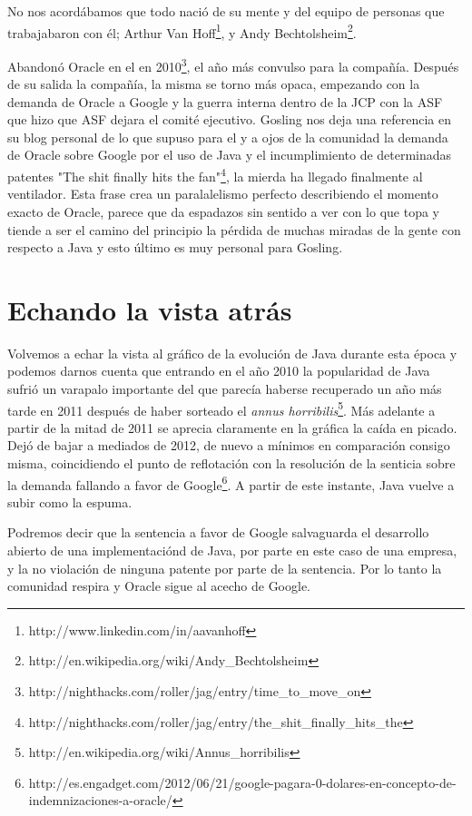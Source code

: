 \documentclass[11pt]{scrartcl}
\begin{document}
No nos acordábamos que todo nació de su mente y del equipo de personas que trabajabaron con él; Arthur Van Hoff\footnote{http://www.linkedin.com/in/aavanhoff}, y Andy Bechtolsheim\footnote{http://en.wikipedia.org/wiki/Andy\_Bechtolsheim}.

Abandonó Oracle en el en 2010\footnote{http://nighthacks.com/roller/jag/entry/time\_to\_move\_on}, el año más convulso para la compañía. Después de su salida la compañía, la misma se torno más opaca, empezando con la demanda de Oracle a Google y la guerra interna dentro de la JCP con la ASF que hizo que ASF dejara el comité ejecutivo. Gosling nos deja una referencia en su blog personal de lo que supuso para el y a ojos de la comunidad la demanda de Oracle sobre Google por el uso de Java y el incumplimiento de determinadas patentes "The shit finally hits the fan"\footnote{http://nighthacks.com/roller/jag/entry/the\_shit\_finally\_hits\_the}, la mierda ha llegado finalmente al ventilador. Esta frase crea un paralalelismo perfecto describiendo el momento exacto de Oracle, parece que da espadazos sin sentido a ver con lo que topa y tiende a ser el camino del principio la pérdida de muchas miradas de la gente con respecto a Java y esto último es muy personal para Gosling.

\section{Echando la vista atrás}

Volvemos a echar la vista al gráfico de la evolución de Java durante esta época y podemos darnos cuenta que entrando en el año 2010 la popularidad de Java sufrió un varapalo importante del que parecía haberse recuperado un año más tarde en 2011 después de haber sorteado el \emph{annus horribilis}\footnote{http://en.wikipedia.org/wiki/Annus\_horribilis}. Más adelante a partir de la mitad de 2011 se aprecia claramente en la gráfica la caída en picado. Dejó de bajar a mediados de 2012, de nuevo a mínimos en comparación consigo misma, coincidiendo el punto de reflotación con la resolución de la senticia sobre la demanda fallando a favor de Google\footnote{http://es.engadget.com/2012/06/21/google-pagara-0-dolares-en-concepto-de-indemnizaciones-a-oracle/}. A partir de este instante, Java vuelve a subir como la espuma.

Podremos decir que la sentencia a favor de Google salvaguarda el desarrollo abierto de una implementaciónd de Java, por parte en este caso de una empresa, y la no violación de ninguna patente por parte de la sentencia. Por lo tanto la comunidad respira y Oracle sigue al acecho de Google.
\end{document}
